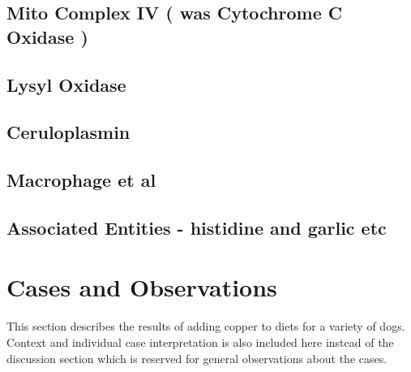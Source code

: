 \njnsitetab

\subsection{ Mito Complex IV ( was  Cytochrome C Oxidase )   }

\mjmcox

\subsection{ Lysyl Oxidase  }

\mjmlox

\subsection{ Ceruloplasmin   }

\mjmcp

\subsection{ Macrophage et al   }

\mjmmacro

\subsection{ Associated Entities - histidine and garlic etc   }

\mjmlig



\section{Cases and Observations}

This section describes the results of adding
copper to diets for a variety of dogs. Context and
individual case interpretation is also included here instead of the
discussion section which is reserved for general observations
about the cases.  

\mjmdogsone


